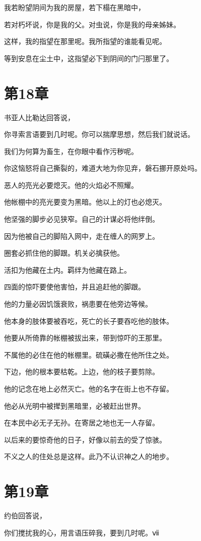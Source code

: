 \documentclass[12pt,oneside]{book}
\begin{document}
我若盼望阴间为我的房屋，若下榻在黑暗中，

若对朽坏说，你是我的父。对虫说，你是我的母亲姊妹。

这样，我的指望在那里呢。我所指望的谁能看见呢。

等到安息在尘土中，这指望必下到阴间的门闩那里了。


\chapter{第18章}
书亚人比勒达回答说，

你寻索言语要到几时呢。你可以揣摩思想，然后我们就说话。

我们为何算为畜生，在你眼中看作污秽呢。

你这恼怒将自己撕裂的，难道大地为你见弃，磐石挪开原处吗。

恶人的亮光必要熄灭。他的火焰必不照耀。

他帐棚中的亮光要变为黑暗。他以上的灯也必熄灭。

他坚强的脚步必见狭窄。自己的计谋必将他绊倒。

因为他被自己的脚陷入网中，走在缠人的网罗上。

圈套必抓住他的脚跟。机关必擒获他。

活扣为他藏在土内。羁绊为他藏在路上。

四面的惊吓要使他害怕，并且追赶他的脚跟。

他的力量必因饥饿衰败，祸患要在他旁边等候。

他本身的肢体要被吞吃，死亡的长子要吞吃他的肢体。

他要从所倚靠的帐棚被拔出来，带到惊吓的王那里。

不属他的必住在他的帐棚里。硫磺必撒在他所住之处。

下边，他的根本要枯乾。上边，他的枝子要剪除。

他的记念在地上必然灭亡。他的名字在街上也不存留。

他必从光明中被撵到黑暗里，必被赶出世界。

在本民中必无子无孙。在寄居之地也无一人存留。

以后来的要惊奇他的日子，好像以前去的受了惊骇。

不义之人的住处总是这样。此乃不认识神之人的地步。


\chapter{第19章}
约伯回答说，

你们搅扰我的心，用言语压碎我，要到几时呢。ⅶ
\end{document}
